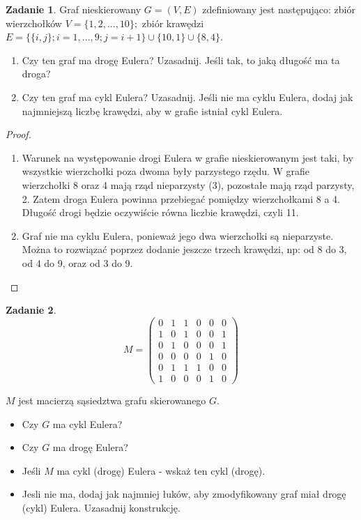 \documentclass[11pt]{article}
\theoremstyle{definition}
\newtheorem{zadanie}{Zadanie}
\begin{document}
\begin{zadanie}

    Graf nieskierowany $G=(V,E)$ zdefiniowany jest następująco: zbiór wierzchołków $V=\{1,2,...,10\};$ zbiór krawędzi $E=\{\{i,j\};i=1,...,9;j=i+1\}\cup\{10,1\}\cup\{8,4\}$.

    \begin{enumerate}
        \item Czy ten graf ma drogę Eulera? Uzasadnij. Jeśli tak, to jaką długość ma ta droga?
        \item Czy ten graf ma cykl Eulera? Uzasadnij. Jeśli nie ma cyklu Eulera, dodaj jak najmniejszą liczbę krawędzi, aby w grafie istniał cykl Eulera.
    \end{enumerate}
\end{zadanie}
\begin{proof}
    \begin{enumerate}
        \item Warunek na występowanie drogi Eulera w grafie nieskierowanym jest taki, by wszystkie wierzchołki poza dwoma były parzystego rzędu. W grafie wierzchołki 8 oraz 4 mają rząd nieparzysty (3), pozostałe mają rząd parzysty, 2. Zatem droga Eulera powinna przebiegać pomiędzy wierzchołkami 8 a 4. Długość drogi będzie oczywiście równa liczbie krawędzi, czyli 11.
        \item Graf nie ma cyklu Eulera, ponieważ jego dwa wierzchołki są nieparzyste. Można to rozwiązać poprzez dodanie jeszcze trzech krawędzi, np: od 8 do 3, od 4 do 9, oraz od 3 do 9.
    \end{enumerate}

\end{proof}
\begin{zadanie}

    $$ M = \left( \begin{matrix} 0 & 1 & 1 & 0 & 0 & 0 \\ 1 & 0 & 1 & 0 & 0 & 1 \\ 0 & 1 & 0 & 0 & 0 & 1 \\ 0 & 0 & 0 & 0 & 1 & 0 \\ 0 & 1 & 1 & 1 & 0 & 0 \\ 1 & 0 & 0 & 0 & 1 & 0 \end{matrix} \right) $$

    $M$ jest macierzą sąsiedztwa grafu skierowanego $G$.

    \begin{itemize}
        \item Czy $G$ ma cykl Eulera?
        \item Czy $G$ ma drogę Eulera?
        \item Jeśli $M$ ma cykl (drogę) Eulera - wskaż ten cykl (drogę).
        \item Jesli nie ma, dodaj jak najmniej łuków, aby zmodyfikowany graf miał drogę (cykl) Eulera. Uzasadnij konstrukcję.
    \end{itemize}

\end{zadanie}
\end{document}
